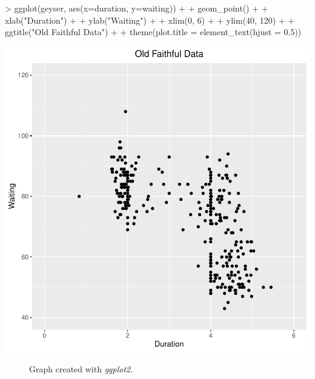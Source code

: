 \documentclass[12pt,letterpaper,final]{article}
\begin{document}
\begin{enumerate}
\begin{enumerate}
\begin{Schunk}
\begin{Sinput}
> ggplot(geyser, aes(x=duration, y=waiting)) +
+   geom_point() +
+   xlab("Duration") +
+   ylab("Waiting") +
+   xlim(0, 6) +
+   ylim(40, 120) +
+   ggtitle("Old Faithful Data") +
+   theme(plot.title = element_text(hjust = 0.5))
\end{Sinput}
\end{Schunk}
\includegraphics{rnw_example-017}


\begin{figure}[ht]
\caption{\label{hw01_q2b}
Graph created with {\it ggplot2}.
}
\end{figure}



\end{enumerate}
\end{enumerate}
\end{document}
